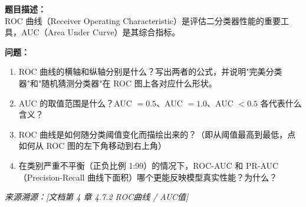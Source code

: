 \documentclass[a4paper,11pt]{ctexart}
\begin{document}
\begin{problembox}
    \textbf{题目描述：}\\
    ROC 曲线（Receiver Operating Characteristic）是评估二分类器性能的重要工具，AUC（Area Under Curve）是其综合指标。

    \vspace{0.2cm}
    \textbf{问题：}
    \begin{enumerate}[(1)]
        \item ROC 曲线的横轴和纵轴分别是什么？写出两者的公式，并说明"完美分类器"和"随机猜测分类器"在 ROC 图上各对应什么形状。

        \item AUC 的取值范围是什么？AUC $= 0.5$、AUC $= 1.0$、AUC $< 0.5$ 各代表什么含义？

        \item ROC 曲线是如何随分类阈值变化而描绘出来的？（即从阈值最高到最低，点如何从 ROC 图的左下角移动到右上角）

        \item 在类别严重不平衡（正负比例 1:99）的情况下，ROC-AUC 和 PR-AUC（Precision-Recall 曲线下面积）哪个更能反映模型真实性能？为什么？
    \end{enumerate}
    {\color{gray}\small\textit{来源溯源：[文档第 4 章 4.7.2 ROC曲线 / AUC值]}}
\end{problembox}
\end{document}
